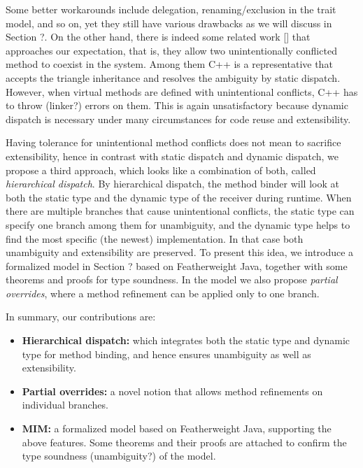 Some better workarounds include delegation, renaming/exclusion in the trait model, and so on, yet they still have various drawbacks as we will discuss in Section ?. On the other hand, there is indeed some related work [] that approaches our expectation, that is, they allow two unintentionally conflicted method to coexist in the system. Among them C++ is a representative that accepts the triangle inheritance and resolves the ambiguity by static dispatch. However, when virtual methods are defined with unintentional conflicts, C++ has to throw (linker?) errors on them.
This is again unsatisfactory because dynamic dispatch is necessary under many circumstances for code reuse and extensibility.

Having tolerance for unintentional method conflicts does not mean to sacrifice extensibility, hence in contrast with static dispatch and dynamic dispatch, we propose a third approach, which looks like a combination of both, called \textit{hierarchical dispatch}. By hierarchical dispatch, the method binder will look at both the static type and the dynamic type of the receiver during runtime. When there are multiple branches that cause unintentional conflicts, the static type can specify one branch among them for unambiguity, and the dynamic type helps to find the most specific (the newest) implementation. In that case both unambiguity and extensibility are preserved. To present this idea, we introduce a formalized model in Section ? based on Featherweight Java, together with some theorems and proofs for type soundness. In the model we also propose \textit{partial overrides}, where a method refinement can be applied only to one branch.

In summary, our contributions are: 
\begin{itemize}
	\item \textbf{Hierarchical dispatch:} which integrates both the static type and dynamic type for method binding, and hence
	ensures unambiguity as well as extensibility.
	\item \textbf{Partial overrides:} a novel notion that allows method refinements on individual branches.
	\item \textbf{MIM:} a formalized model based on Featherweight Java, supporting the above features. Some theorems and their proofs
	are attached to confirm the type soundness (unambiguity?) of the model.
\end{itemize}

 